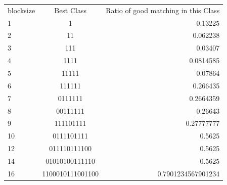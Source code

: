 \documentclass{article}
\begin{document}
\begin{tabular}{|l|c|r|}
  \hline
  blocksize & Best Class & Ratio of good matching in this Class\\
	1 & 1 & 0.13225\\
	2 & 11 & 0.062238\\
	3 & 111 & 0.03407\\
	4 & 1111 & 0.0814585\\
	5 & 11111 & 0.07864\\
	6 & 111111 & 0.266435\\
	7 & 0111111 & 0.2664359\\
	8 & 00111111 & 0.26643\\
	9 & 111101111 & 0.27777777\\
	10 & 0111101111 & 0.5625\\
	12 & 011110111100 & 0.5625\\
	14 & 01010100111110 & 0.5625\\
	16 & 1100010111001100 & 0.7901234567901234\\
	\hline
\end{tabular}

\appendix
\newpage
\end{document}
